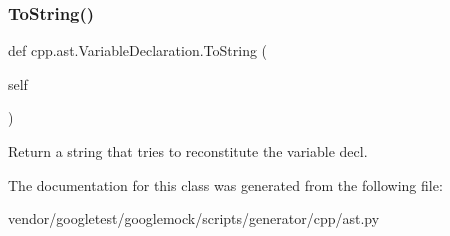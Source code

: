 \subsubsection{\texorpdfstring{To\+String()}{ToString()}}
{\footnotesize\ttfamily def cpp.\+ast.\+Variable\+Declaration.\+To\+String (\begin{DoxyParamCaption}\item[{}]{self }\end{DoxyParamCaption})}

\begin{DoxyVerb}Return a string that tries to reconstitute the variable decl.\end{DoxyVerb}
 

The documentation for this class was generated from the following file\+:\begin{DoxyCompactItemize}
\item 
vendor/googletest/googlemock/scripts/generator/cpp/ast.\+py\end{DoxyCompactItemize}
